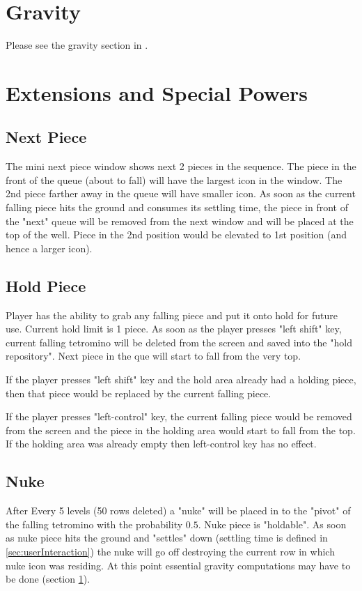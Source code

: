 \documentclass[10pt]{report}
\theoremstyle{definition}
\theoremstyle{remark}
\begin{document}
\section{Gravity}
\label{sec:gravity}
Please see the gravity section in \cite{wikitetris}.

\section{Extensions and Special Powers}
\subsection{Next Piece}
\label{sec:nextPiece}
The mini next piece window shows next 2 pieces in the sequence. The piece in the front of the queue (about to fall) will have the largest icon in the window. The 2nd piece farther away in the queue will have smaller icon. As soon as the current falling piece hits the ground and consumes its settling time, the piece in front of the "next" queue will be removed from the next window and will be placed at the top of the well. Piece in the 2nd position would be elevated to 1st position (and hence a larger icon).

\subsection{Hold Piece}
\label{sec:holdPiece}
Player has the ability to grab any falling piece and put it onto hold for future use. Current hold limit is 1 piece. As soon as the player presses "left shift" key, current falling tetromino will be deleted from the screen and saved into the "hold repository". Next piece in the que will start to fall from the very top.

If the player presses "left shift" key and the hold area already had a holding piece, then that piece would be replaced by the current falling piece.

If the player presses "left-control" key, the current falling piece would be removed from the screen and the piece in the holding area would start to fall from the top. If the holding area was already empty then left-control key has no effect.

\subsection{Nuke}
After Every 5 levels (50 rows deleted) a "nuke" will be placed in to the "pivot" of the falling tetromino with the probability $0.5$. Nuke piece is "holdable". As soon as nuke piece hits the ground and "settles" down (settling time is defined in \ref{sec:userInteraction}) the nuke will go off destroying the current row in which nuke icon was residing. At this point essential gravity computations may have to be done (section \ref{sec:gravity}).
\end{document}
